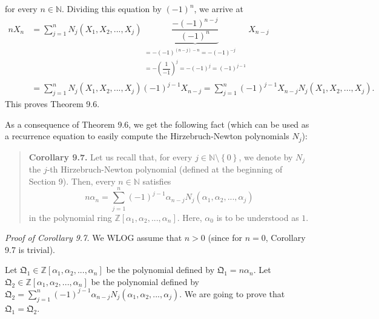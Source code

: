 \documentclass[numbers=enddot,12pt,final,onecolumn,notitlepage]{scrartcl}%
\begin{document}
for every $n\in\mathbb{N}$. Dividing this equation by $\left(  -1\right)
^{n}$, we arrive at%
\begin{align*}
nX_{n}  &  =\sum_{j=1}^{n}N_{j}\left(  X_{1},X_{2},...,X_{j}\right)
\underbrace{\dfrac{-\left(  -1\right)  ^{n-j}}{\left(  -1\right)  ^{n}}%
}_{\substack{=-\left(  -1\right)  ^{\left(  n-j\right)  -n}=-\left(
-1\right)  ^{-j}\\=-\left(  \dfrac{1}{-1}\right)  ^{j}=-\left(  -1\right)
^{j}=\left(  -1\right)  ^{j-1}}}X_{n-j}\\
&  =\sum_{j=1}^{n}N_{j}\left(  X_{1},X_{2},...,X_{j}\right)  \left(
-1\right)  ^{j-1}X_{n-j}=\sum_{j=1}^{n}\left(  -1\right)  ^{j-1}X_{n-j}%
N_{j}\left(  X_{1},X_{2},...,X_{j}\right)  .
\end{align*}
This proves Theorem 9.6.

As a consequence of Theorem 9.6, we get the following fact (which can be used
as a recurrence equation to easily compute the Hirzebruch-Newton polynomials
$N_{j}$):

\begin{quote}
\textbf{Corollary 9.7.} Let us recall that, for every $j\in\mathbb{N}%
\setminus\left\{  0\right\}  $, we denote by $N_{j}$ the $j$-th
Hirzebruch-Newton polynomial (defined at the beginning of Section 9). Then,
every $n\in\mathbb{N}$ satisfies%
\[
n\alpha_{n}=\sum\limits_{j=1}^{n}\left(  -1\right)  ^{j-1}\alpha_{n-j}%
N_{j}\left(  \alpha_{1},\alpha_{2},...,\alpha_{j}\right)
\]
in the polynomial ring $\mathbb{Z}\left[  \alpha_{1},\alpha_{2},...,\alpha
_{n}\right]  $. Here, $\alpha_{0}$ is to be understood as $1$.
\end{quote}

\textit{Proof of Corollary 9.7.} We WLOG assume that $n>0$ (since for $n=0$,
Corollary 9.7 is trivial).

Let $\mathfrak{Q}_{1}\in\mathbb{Z}\left[  \alpha_{1},\alpha_{2},...,\alpha
_{n}\right]  $ be the polynomial defined by $\mathfrak{Q}_{1}=n\alpha_{n}$.
Let $\mathfrak{Q}_{2}\in\mathbb{Z}\left[  \alpha_{1},\alpha_{2},...,\alpha
_{n}\right]  $ be the polynomial defined by $\mathfrak{Q}_{2}=\sum
\limits_{j=1}^{n}\left(  -1\right)  ^{j-1}\alpha_{n-j}N_{j}\left(  \alpha
_{1},\alpha_{2},...,\alpha_{j}\right)  $. We are going to prove that
$\mathfrak{Q}_{1}=\mathfrak{Q}_{2}$.
\end{document}
